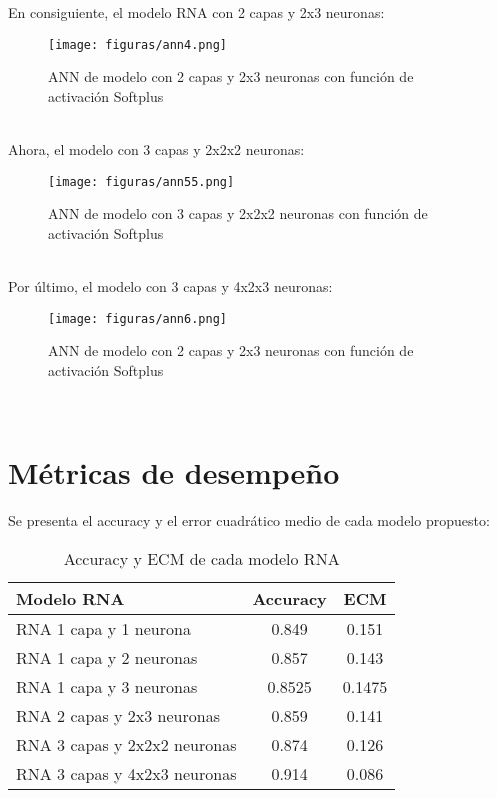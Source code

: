 \documentclass{report}
\begin{document}
En consiguiente, el modelo RNA con 2 capas y 2x3 neuronas:\\

\begin{figure}[htp]
        \centering
    	\texttt{[image: figuras/ann4.png]}
    	\label{fig: Figura1}
    	\caption{ANN de modelo con 2 capas y 2x3 neuronas con función de activación Softplus}
        \end{figure}\\

Ahora, el modelo con 3 capas y 2x2x2 neuronas:\\
\vspace{3cm}

\begin{figure}[htp]
        \centering
    	\texttt{[image: figuras/ann55.png]}
    	\label{fig: Figura1}
    	\caption{ANN de modelo con 3 capas y 2x2x2 neuronas con función de activación Softplus}
        \end{figure}\\

Por último, el modelo con 3 capas y 4x2x3 neuronas:\\

\begin{figure}[htp]
        \centering
    	\texttt{[image: figuras/ann6.png]}
    	\label{fig: Figura1}
    	\caption{ANN de modelo con 2 capas y 2x3 neuronas con función de activación Softplus}
        \end{figure}\\
\newpage
\section{Métricas de desempeño}
Se presenta el accuracy y el error cuadrático medio de cada modelo propuesto:\\

\begin{table}[h!]
  \begin{center}
    \label{tab:table1}
    \begin{tabular}{|l|c|c|} 
    \hline
      \textbf{Modelo RNA} & \textbf{Accuracy} & \textbf{ECM}\\
      \hline
      RNA 1 capa y 1 neurona & 0.849 & 0.151 \\
      \hline 
      RNA 1 capa y 2 neuronas &  0.857 & 0.143\\
      \hline
      RNA 1 capa y 3 neuronas & 0.8525 & 0.1475 \\
      \hline
      RNA 2 capas y 2x3 neuronas & 0.859 & 0.141 \\
      \hline
      RNA 3 capas y 2x2x2 neuronas & 0.874 & 0.126 \\
      \hline
      RNA 3 capas y 4x2x3 neuronas & 0.914 & 0.086\\
      \hline
    \end{tabular}
  \end{center}
  \caption{Accuracy y ECM de cada modelo RNA}
\end{table}\\
\end{document}
